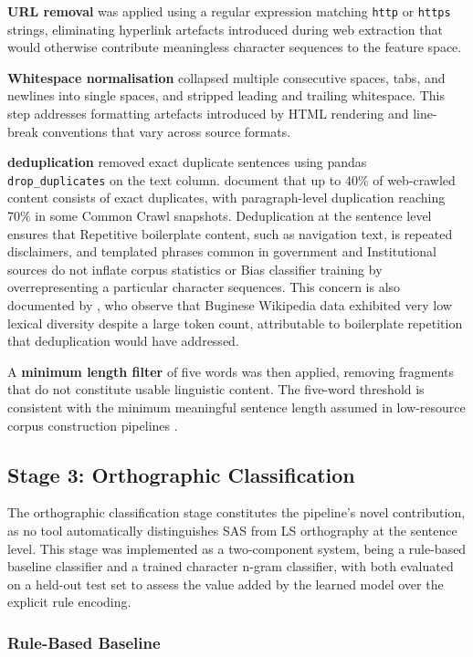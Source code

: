 \documentclass[12pt]{ThesisRU}
\begin{document}
\textbf{URL removal} was applied using a regular expression matching
\texttt{http} or \texttt{https} strings, eliminating hyperlink
artefacts introduced during web extraction that would otherwise
contribute meaningless character sequences to the feature space.

\textbf{Whitespace normalisation} collapsed multiple consecutive
spaces, tabs, and newlines into single spaces, and stripped leading
and trailing whitespace. This step addresses formatting artefacts
introduced by HTML rendering and line-break
conventions that vary across source formats.

\textbf{deduplication} removed exact duplicate sentences using
pandas \texttt{drop\_duplicates} on the text column.
\citet{tatariya2024good} document that up to 40\% of
web-crawled content consists of exact duplicates, with
paragraph-level duplication reaching 70\% in some Common Crawl
snapshots. Deduplication at the sentence level ensures that
Repetitive boilerplate content, such as navigation text, is repeated
disclaimers, and templated phrases common in government and
Institutional sources do not inflate corpus statistics or
Bias classifier training by overrepresenting a particular character
sequences. This concern is also documented by
\citet{cahyawijaya2023nusawrites}, who observe that Buginese
Wikipedia data exhibited very low lexical diversity despite a large
token count, attributable to boilerplate repetition that deduplication
would have addressed.

A \textbf{minimum length filter} of five words was then applied,
removing fragments that do not constitute usable linguistic content.
The five-word threshold is consistent with the minimum meaningful
sentence length assumed in low-resource corpus construction
pipelines \citep{de2024data}.

\subsection{Stage 3: Orthographic Classification}
The orthographic classification stage constitutes the pipeline's novel contribution, as no tool automatically distinguishes SAS from LS orthography at the sentence level. This stage was implemented as a two-component system, being a rule-based baseline classifier and a trained character n-gram classifier, with both evaluated on a held-out test set to assess the value added by the learned model over the explicit rule encoding.

\subsubsection{Rule-Based Baseline}
\label{sec:rulebased}
\end{document}
